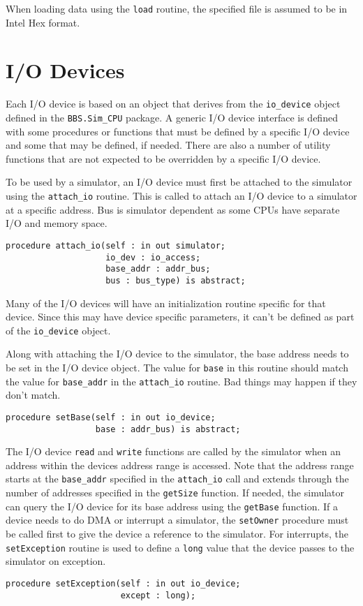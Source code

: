 \documentclass[10pt, openany]{book}
\newcommand{\package}[1]{\texttt{#1}}
\newcommand{\function}[1]{\texttt{#1}}
\newcommand{\keyword}[1]{\texttt{#1}}
\newcommand{\datatype}[1]{\texttt{#1}}
\begin{document}
When loading data using the \function{load} routine, the specified file is assumed to be in Intel Hex format.

\chapter{I/O Devices}
\label{chap:IODev}
Each I/O device is based on an object that derives from the \datatype{io\_device} object defined in the \package{BBS.Sim\_CPU} package.  A generic I/O device interface is defined with some procedures or functions that must be defined by a specific I/O device and some that may be defined, if needed.  There are also a number of utility functions that are not expected to be overridden by a specific I/O device.

To be used by a simulator, an I/O device must first be attached to the simulator using the \function{attach\_io} routine.  This is called to attach an I/O device to a simulator at a specific address.  Bus is simulator dependent as some CPUs have separate I/O and memory space.
\begin{lstlisting}
procedure attach_io(self : in out simulator;
                    io_dev : io_access;
                    base_addr : addr_bus;
                    bus : bus_type) is abstract;
\end{lstlisting}

Many of the I/O devices will have an initialization routine specific for that device.  Since this may have device specific parameters, it can't be defined as part of the \datatype{io\_device} object.

Along with attaching the I/O device to the simulator, the base address needs to be set in the I/O device object.  The value for \keyword{base} in this routine should match the value for \keyword{base\_addr} in the \function{attach\_io} routine.  Bad things may happen if they don't match.
\begin{lstlisting}
procedure setBase(self : in out io_device;
                  base : addr_bus) is abstract;
\end{lstlisting}

The I/O device \verb|read| and \verb|write| functions are called by the simulator when an address within the devices address range is accessed.  Note that the address range starts at the \verb|base_addr| specified in the \verb|attach_io| call and extends through the number of addresses specified in the \verb|getSize| function.  If needed, the simulator can query the I/O device for its base address using the \verb|getBase| function.  If a device needs to do DMA or interrupt a simulator, the \verb|setOwner| procedure must be called first to give the device a reference to the simulator.  For interrupts, the \verb|setException| routine is used to define a \verb|long| value that the device passes to the simulator on exception.
\begin{lstlisting}
procedure setException(self : in out io_device;
                       except : long);
\end{lstlisting}
\end{document}

